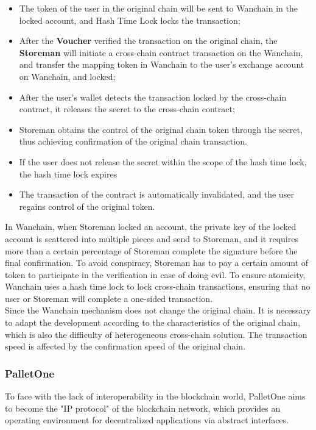 \begin{itemize}

    \item The token of the user in the original chain will be sent to Wanchain in the locked account, and Hash Time Lock locks the transaction;
    \item After the \textbf{Voucher} verified  the transaction on the original chain, the \textbf{Storeman} will initiate a cross-chain contract transaction on the Wanchain, and transfer the mapping token in Wanchain to the user's exchange account on Wanchain, and locked;
    \item After the user's wallet detects the transaction locked by the cross-chain contract, it releases the secret to the cross-chain contract;
    \item Storeman obtains the control of the original chain token through the secret, thus achieving confirmation of the original chain transaction.
    \item If the user does not release the secret within the scope of the hash time lock, the hash time lock expires
    \item The transaction of the contract is automatically invalidated, and the user regains control of the original token.
\end{itemize}
\noindent In Wanchain, when Storeman locked an account, the private key of the locked account is scattered into multiple pieces and send to Storeman, and it requires more than a certain percentage of Storeman complete the signature before the final confirmation. To avoid conspiracy, Storeman has to pay a certain amount of token to participate in the verification in case of doing evil. To ensure atomicity, Wanchain uses a hash time lock to lock cross-chain transactions, ensuring that no user or Storeman will complete a one-sided transaction.\\

\noindent Since the Wanchain mechanism does not change the original chain. It is necessary to adapt the development according to the characteristics of the original chain, which is also the difficulty of heterogeneous cross-chain solution. The transaction speed is affected by the confirmation speed of the original chain.\\

\subsubsection{PalletOne}
\noindent To face with the lack of interoperability in the blockchain world, PalletOne aims to become the "IP protocol" of the blockchain network, which provides an operating environment for decentralized applications via abstract interfaces.~\cite{palletone} \\


